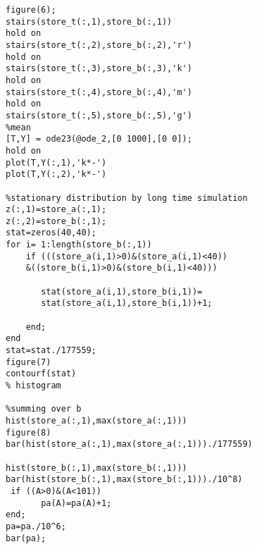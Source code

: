 \documentclass[10 pt]{article}
\begin{document}
\begin{multicols}{2}
\begin{flushleft}
\begin{lstlisting}
figure(6);
stairs(store_t(:,1),store_b(:,1))
hold on
stairs(store_t(:,2),store_b(:,2),'r')
hold on
stairs(store_t(:,3),store_b(:,3),'k')
hold on
stairs(store_t(:,4),store_b(:,4),'m')
hold on
stairs(store_t(:,5),store_b(:,5),'g')
%mean
[T,Y] = ode23(@ode_2,[0 1000],[0 0]);
hold on
plot(T,Y(:,1),'k*-')
plot(T,Y(:,2),'k*-')

%stationary distribution by long time simulation
z(:,1)=store_a(:,1);
z(:,2)=store_b(:,1);
stat=zeros(40,40);
for i= 1:length(store_b(:,1))
    if (((store_a(i,1)>0)&(store_a(i,1)<40))
    &((store_b(i,1)>0)&(store_b(i,1)<40)))
       
       stat(store_a(i,1),store_b(i,1))=
       stat(store_a(i,1),store_b(i,1))+1; 
       
    end;
end
stat=stat./177559;
figure(7)
contourf(stat)
% histogram

%summing over b
hist(store_a(:,1),max(store_a(:,1)))
figure(8)
bar(hist(store_a(:,1),max(store_a(:,1)))./177559)

hist(store_b(:,1),max(store_b(:,1)))
bar(hist(store_b(:,1),max(store_b(:,1)))./10^8)
 if ((A>0)&(A<101))
       pa(A)=pa(A)+1;
end;
pa=pa./10^6;
bar(pa);
\end{lstlisting}
\end{flushleft}


\end{multicols}
\end{document}
